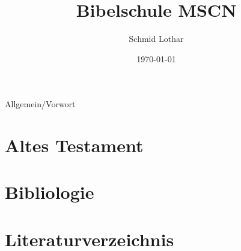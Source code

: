 \documentclass[a4paper, 12pt]{article}
\title{Bibelschule MSCN}
\author{Schmid Lothar}
\date{\today}
\begin{document}

\tableofcontents

\newpage
 {Allgemein/Vorwort}
\newpage
\section{Altes Testament}

\newpage
\section{Bibliologie}

\newpage
\section{Literaturverzeichnis}

\end{document}
